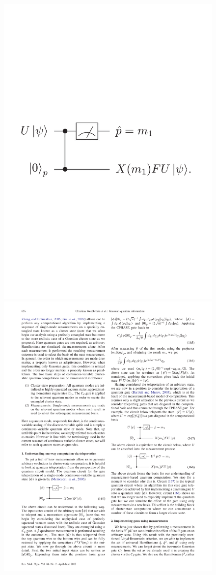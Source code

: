 \documentclass[reprint,
superscriptaddress,
 amsmath,amssymb,
 aps,
prb,
]{revtex4-1}
\begin{document}
\begin{figure}[thb]
\includegraphics[trim = 0cm 10cm 0cm 10cm, clip, width=0.8\linewidth]{teleport_circ2.pdf}
\\
\includegraphics[trim = 0cm 0cm 0cm 0cm, clip, width=0.8\linewidth]{teleport_circ3.pdf}
\caption{\label{fig:cluster_Teleport23}}
\end{figure}
\end{document}
